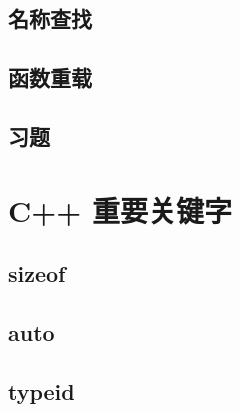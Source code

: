 \documentclass{article}
\begin{document}
		
		
		\subsection{名称查找}
		\subsection{函数重载}
		
		

		
		
		\subsection{习题}
		 
		
	\section{C++ 重要关键字}
	\subsection{sizeof}
	\subsection{auto}
	\subsection{typeid}
\end{document}
